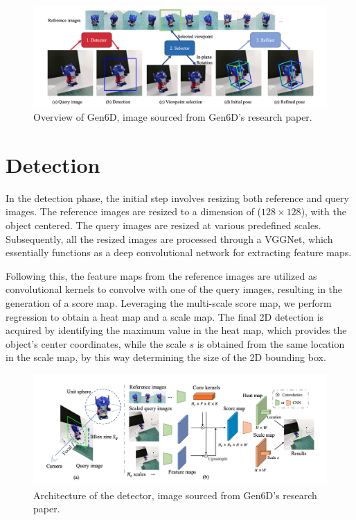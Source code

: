 \begin{figure}[ht]
  \centering
  \includegraphics[width=\textwidth]{data/gen6d1.png}
  \caption{Overview of Gen6D, image sourced from Gen6D's research paper.}
  \label{fig:fig0}
\end{figure}

\section{Detection}

In the detection phase, the initial step involves resizing both reference and query images. The reference images are resized to a dimension of ($128 \times 128$), with the object centered. The query images are resized at various predefined scales. Subsequently, all the resized images are processed through a \ac{VGGNet}, which essentially functions as a deep convolutional network for extracting feature maps.

Following this, the feature maps from the reference images are utilized as convolutional kernels to convolve with one of the query images, resulting in the generation of a score map. Leveraging the multi-scale score map, we perform regression to obtain a heat map and a scale map. The final 2D detection is acquired by identifying the maximum value in the heat map, which provides the object's center coordinates, while the scale $s$ is obtained from the same location in the scale map, by this way determining the size of the 2D bounding box.

\begin{figure}[ht]
  \centering
  \includegraphics[width=\textwidth]{data/gen6d2.png}
  \caption{Architecture of the detector, image sourced from Gen6D's research paper.}
  \label{fig:fig1}
\end{figure}

